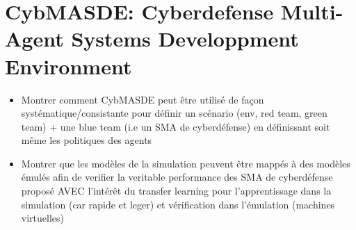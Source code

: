 \chapter{CybMASDE: Cyberdefense Multi-Agent Systems Developpment Environment}\label{ch:cybmasde} %

\begin{itemize}

    \item Montrer comment CybMASDE peut être utilisé de façon systématique/consistante pour définir un scénario (env, red team, green team) + une blue team (i.e un SMA de cyberdéfense) en définissant soit même les politiques des agents
    \item Montrer que les modèles de la simulation peuvent être mappés à des modèles émulés afin de verifier la veritable performance des SMA de cyberdéfense proposé AVEC l'intérêt du transfer learning pour l’apprentissage dans la simulation (car rapide et leger) et vérification dans l’émulation (machines virtuelles)
\end{itemize}
